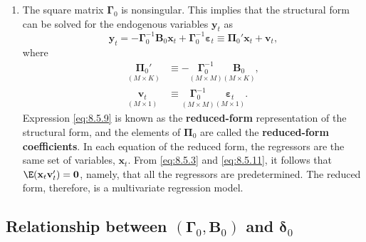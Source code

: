 \begin{enumerate}
\item The square matrix $\boldsymbol{\Gamma}_0$ is nonsingular. This implies that the structural form can
  be solved for the endogenous variables $\mathbf{y}_t$ as
  \begin{equation}
    \mathbf{y}_t = -\boldsymbol{\Gamma}_0^{-1}\mathbf{B}_0\mathbf{x}_t
    + \boldsymbol{\Gamma}_0^{-1}\boldsymbol{\varepsilon}_t
    \equiv \boldsymbol{\Pi}_0'\mathbf{x}_t + \mathbf{v}_t,
    \label{eq:8.5.9} \tag{8.5.9}
  \end{equation}
  where
  \begin{align}
    \underset{(M \times K)}{\boldsymbol{\Pi}_0'} &\equiv
    -\underset{(M \times M)}{\boldsymbol{\Gamma}_0^{-1}}
    \underset{(M \times K)}{\mathbf{B}_0},
    \label{eq:8.5.10} \tag{8.5.10} \\
    \underset{(M \times 1)}{\mathbf{v}_t} &\equiv
    \underset{(M \times M)}{\boldsymbol{\Gamma}_0^{-1}}
    \underset{(M \times 1)}{\boldsymbol{\varepsilon}_t}.
    \label{eq:8.5.11} \tag{8.5.11}
  \end{align}
  Expression \eqref{eq:8.5.9} is known as the \textbf{reduced-form} representation of the structural form, and the elements of $\boldsymbol{\Pi}_0$ are called the \textbf{reduced-form coefficients}. In
  each equation of the reduced form, the regressors are the same set of variables,
  $\mathbf{x}_t$. From \eqref{eq:8.5.3} and \eqref{eq:8.5.11}, it follows that
  $\E(\mathbf{x}_t\mathbf{v}_t') = \mathbf{0}$, namely, that all the
  regressors are predetermined. The reduced form, therefore, is a multivariate
  regression model.
\end{enumerate}

\subsection*{Relationship between \texorpdfstring{$(\boldsymbol{\Gamma}_0, \mathbf{B}_0)$}{(Gamma0, B0)} and \texorpdfstring{$\boldsymbol{\delta}_0$}{delta0}}


